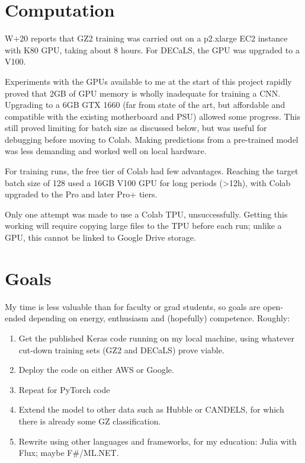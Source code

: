 \documentclass[preprint]{aastex631}
\begin{document}
\section{Computation} \label{sec:comp}

W+20 reports that GZ2 training was carried out on a p2.xlarge EC2 instance with K80 GPU, taking about 8 hours. For DECaLS, the GPU was upgraded to a V100.

Experiments with the GPUs available to me at the start of this project rapidly proved that 2GB of GPU memory is wholly inadequate for training a CNN. Upgrading to a 6GB GTX 1660 (far from state of the art, but affordable and compatible with the existing motherboard and PSU) allowed some progress. This still proved limiting for batch size as discussed below, but was useful for debugging before moving to Colab. Making predictions from a pre-trained model was less demanding and worked well on local hardware.

For training runs, the free tier of Colab had few advantages. Reaching the target batch size of 128 used a 16GB V100 GPU for long periods (>12h), with Colab upgraded to the Pro and later Pro+ tiers.

Only one attempt was made to use a Colab TPU, unsuccessfully. Getting this working will require copying large files to the TPU before each run; unlike a GPU, this cannot be linked to Google Drive storage.


\section{Goals} \label{sec:goals}

My time is less valuable than for faculty or grad students, so goals are open-ended depending on energy, enthusiasm and (hopefully) competence. Roughly:
\begin{enumerate}
	\item Get the published Keras code running on my local machine, using whatever cut-down training sets (GZ2 and DECaLS) prove viable.
	\item Deploy the code on either AWS or Google.
	\item Repeat for PyTorch code
	\item Extend the model to other data such as Hubble or CANDELS, for which there is already some GZ classification.
	\item Rewrite using other languages and frameworks, for my education: Julia with Flux; maybe F\#/ML.NET.
\end{enumerate}
\end{document}
